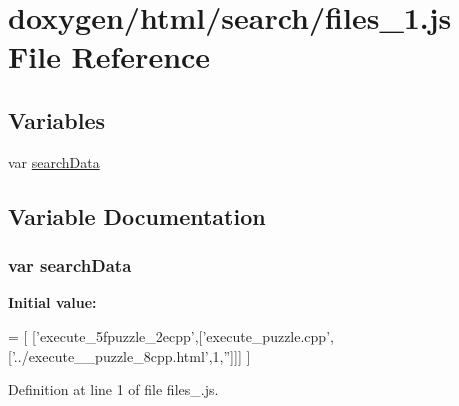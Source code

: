 \hypertarget{a00074}{}\section{doxygen/html/search/files\+\_\+1.js File Reference}
\label{a00074}
\subsection*{Variables}
\begin{DoxyCompactItemize}
\item 
var \hyperlink{a00074_ad01a7523f103d6242ef9b0451861231e}{search\+Data}
\end{DoxyCompactItemize}


\subsection{Variable Documentation}
\hypertarget{a00074_ad01a7523f103d6242ef9b0451861231e}{}
\subsubsection[{search\+Data}]{\setlength{\rightskip}{0pt plus 5cm}var search\+Data}\label{a00074_ad01a7523f103d6242ef9b0451861231e}
{\bfseries Initial value\+:}
\begin{DoxyCode}
=
[
  [\textcolor{stringliteral}{'execute\_5fpuzzle\_2ecpp'},[\textcolor{stringliteral}{'execute\_puzzle.cpp'},[\textcolor{stringliteral}{'../execute\_\_puzzle\_8cpp.html'},1,\textcolor{stringliteral}{''}]]]
]
\end{DoxyCode}


Definition at line 1 of file files\+\_.\+js.

